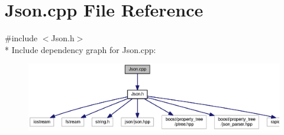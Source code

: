 \section{Json.\-cpp File Reference}
\label{_json_8cpp}
{\ttfamily \#include $<$Json.\-h$>$}\\*
Include dependency graph for Json.\-cpp\-:\nopagebreak
\begin{figure}[H]
\begin{center}
\leavevmode
\includegraphics[width=350pt]{_json_8cpp__incl}
\end{center}
\end{figure}
